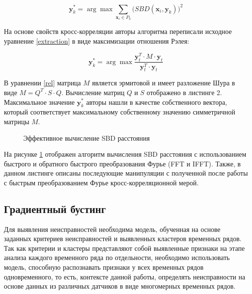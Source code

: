 \begin{equation} \label{extraction}
    \textbf{y}_k^*= \arg \max \sum_{\textbf{x}_i \in P_k}\Big(SBD(\textbf{x}_i, \textbf{y}_k)\Big)^2
\end{equation}

На основе свойств кросс-корреляции авторы алгоритма переписали исходное уравнение \ref{extraction}
в виде максимизации отношения Рэлея:

\begin{equation} \label{rel}
    \textbf{y}_k^* = \arg \max \frac{\textbf{y}_t^T \cdot M \cdot \textbf{y}_t}{\textbf{y}_t^T \cdot \textbf{y}_t}
\end{equation}

В уравнении \ref{rel} матрица $M$ является эрмитовой и имеет разложение Шура в виде $M = Q^T \cdot S \cdot Q$.
Вычисление матриц $Q$ и $S$ отображено в листинге 2.
Максимальное значение $\textbf{y}_k^*$ авторы нашли в качестве собственного вектора,
который соответствует максимальному собственному значению симметричной матрицы $M$.

\begin{figure}[H]
    \caption{Эффективное вычисление SBD расстояния}
    \label{sbdimg}
\end{figure}

На рисунке \ref{sbdimg} отображен алгоритм вычисления SBD расстояния
с использованием быстрого и обратного быстрого преобразования Фурье (FFT и IFFT).
Также, в данном листинге описаны последующие манипуляции с полученной
после работы с быстрым преобразованием Фурье кросс-корреляционной мерой.


\subsection{Градиентный бустинг}

Для выявления неисправностей необходима модель,
обученная на основе заданных критериев неисправностей и выявленных кластеров временных рядов.
Так как критерии и кластеры представляют собой выявленные признаки
на этапе анализа каждого временного ряда по отдельности,
необходимо использовать модель,
способную распознавать признаки
у всех временных рядов одновременного,
то есть, контексте данной работы,
определять неисправности на основе данных из различных датчиков
в виде многомерных временных рядов.

